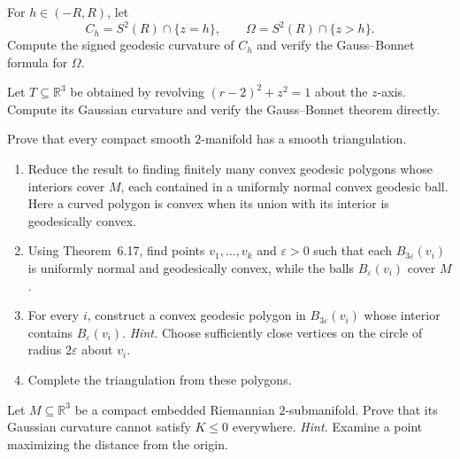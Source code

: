 \begin{exercise}
\label{prob:gauss-bonnet-sphere}

For $h\in(-R,R)$, let
\[
C_h=S^2(R)\cap\{z=h\},
\qquad
\Omega=S^2(R)\cap\{z>h\}.
\]
Compute the signed geodesic curvature of $C_h$ and verify the Gauss--Bonnet
formula for $\Omega$.
\end{exercise}

\begin{exercise}
\label{prob:gauss-bonnet-torus}

Let $T\subseteq\mathbb R^3$ be obtained by revolving
$(r-2)^2+z^2=1$ about the $z$-axis. Compute its Gaussian curvature and verify
the Gauss--Bonnet theorem directly.
\end{exercise}

\begin{exercise}
\label{prob:triangulation-2manifold}

Prove that every compact smooth $2$-manifold has a smooth triangulation.
\begin{enumerate}
\item[(a)] Reduce the result to finding finitely many convex geodesic polygons
whose interiors cover $M$, each contained in a uniformly normal convex
geodesic ball. Here a curved polygon is convex when its union with its
interior is geodesically convex.
\item[(b)] Using Theorem~6.17, find points $v_1,\ldots,v_k$ and
$\varepsilon>0$ such that each $B_{3\varepsilon}(v_i)$ is uniformly normal
and geodesically convex, while the balls $B_\varepsilon(v_i)$ cover $M$.
\item[(c)] For every $i$, construct a convex geodesic polygon in
$B_{3\varepsilon}(v_i)$ whose interior contains $B_\varepsilon(v_i)$.
\emph{Hint.} Choose sufficiently close vertices on the circle of radius
$2\varepsilon$ about $v_i$.
\item[(d)] Complete the triangulation from these polygons.
\end{enumerate}
\end{exercise}

\begin{exercise}
\label{prob:embedded-submanifold-positive-curvature}

Let $M\subseteq\mathbb R^3$ be a compact embedded Riemannian
$2$-submanifold. Prove that its Gaussian curvature cannot satisfy
$K\leq0$ everywhere. \emph{Hint.} Examine a point maximizing the distance
from the origin.
\end{exercise}

